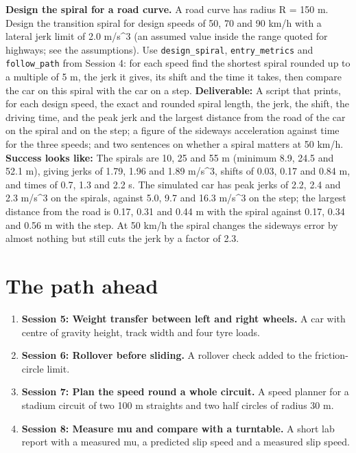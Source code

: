 \documentclass[11pt,a4paper]{article}
\begin{document}
\textbf{Design the spiral for a road curve.} A road curve has radius R = 150 m. Design the transition spiral for design speeds of 50, 70 and 90 km/h with a lateral jerk limit of 2.0 m/s\textasciicircum{}3 (an assumed value inside the range quoted for highways; see the assumptions). Use \texttt{design\_spiral}, \texttt{entry\_metrics} and \texttt{follow\_path} from Session 4: for each speed find the shortest spiral rounded up to a multiple of 5 m, the jerk it gives, its shift and the time it takes, then compare the car on this spiral with the car on a step. \textbf{Deliverable:} A script that prints, for each design speed, the exact and rounded spiral length, the jerk, the shift, the driving time, and the peak jerk and the largest distance from the road of the car on the spiral and on the step; a figure of the sideways acceleration against time for the three speeds; and two sentences on whether a spiral matters at 50 km/h. \textbf{Success looks like:} The spirals are 10, 25 and 55 m (minimum 8.9, 24.5 and 52.1 m), giving jerks of 1.79, 1.96 and 1.89 m/s\textasciicircum{}3, shifts of 0.03, 0.17 and 0.84 m, and times of 0.7, 1.3 and 2.2 s. The simulated car has peak jerks of 2.2, 2.4 and 2.3 m/s\textasciicircum{}3 on the spirals, against 5.0, 9.7 and 16.3 m/s\textasciicircum{}3 on the step; the largest distance from the road is 0.17, 0.31 and 0.44 m with the spiral against 0.17, 0.34 and 0.56 m with the step. At 50 km/h the spiral changes the sideways error by almost nothing but still cuts the jerk by a factor of 2.3.

\section{The path ahead}
\begin{enumerate}[nosep]
\item \textbf{Session 5: Weight transfer between left and right wheels.} A car with centre of gravity height, track width and four tyre loads.
\item \textbf{Session 6: Rollover before sliding.} A rollover check added to the friction-circle limit.
\item \textbf{Session 7: Plan the speed round a whole circuit.} A speed planner for a stadium circuit of two 100 m straights and two half circles of radius 30 m.
\item \textbf{Session 8: Measure mu and compare with a turntable.} A short lab report with a measured mu, a predicted slip speed and a measured slip speed.
\end{enumerate}
\end{document}
